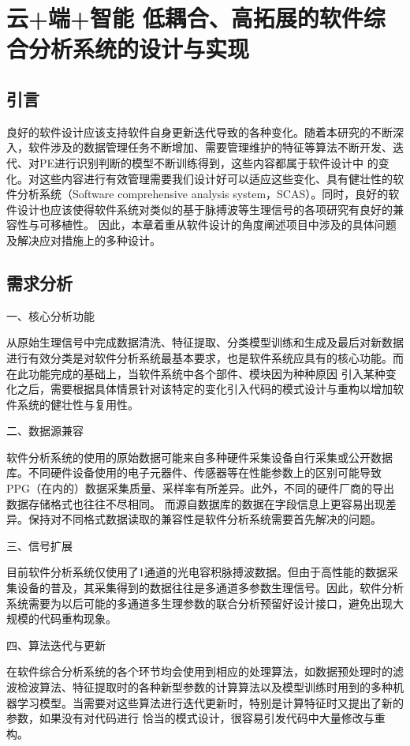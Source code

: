 \chapter{云+端+智能 低耦合、高拓展的软件综合分析系统的设计与实现}
\section{引言}
良好的软件设计应该支持软件自身更新迭代导致的各种变化\cite{Enrich2018}。随着本研究的不断深入，软件涉及的数据管理任务不断增加、需要管理维护的特征等算法不断开发、迭代、对PE进行识别判断的模型不断训练得到，这些内容都属于软件设计中
的变化。对这些内容进行有效管理需要我们设计好可以适应这些变化、具有健壮性的软件分析系统（Software comprehensive analysis system，SCAS）。同时，良好的软件设计也应该使得软件系统对类似的基于脉搏波等生理信号的各项研究有良好的兼容性与可移植性。
因此，本章着重从软件设计的角度阐述项目中涉及的具体问题及解决应对措施上的多种设计。

\section{需求分析}
一、核心分析功能

从原始生理信号中完成数据清洗、特征提取、分类模型训练和生成及最后对新数据进行有效分类是对软件分析系统最基本要求，也是软件系统应具有的核心功能。而在此功能完成的基础上，当软件系统中各个部件、模块因为种种原因
引入某种变化之后，需要根据具体情景针对该特定的变化引入代码的模式设计与重构以增加软件系统的健壮性与复用性。

二、数据源兼容

软件分析系统的使用的原始数据可能来自多种硬件采集设备自行采集或公开数据库。不同硬件设备使用的电子元器件、传感器等在性能参数上的区别可能导致PPG（在内的）数据采集质量、采样率有所差异。此外，不同的硬件厂商的导出数据存储格式也往往不尽相同。
而源自数据库的数据在字段信息上更容易出现差异。保持对不同格式数据读取的兼容性是软件分析系统需要首先解决的问题。

三、信号扩展

目前软件分析系统仅使用了1通道的光电容积脉搏波数据。但由于高性能的数据采集设备的普及，其采集得到的数据往往是多通道多参数生理信号。因此，软件分析系统需要为以后可能的多通道多生理参数的联合分析预留好设计接口，避免出现大规模的代码重构现象。

四、算法迭代与更新

在软件综合分析系统的各个环节均会使用到相应的处理算法，如数据预处理时的滤波检波算法、特征提取时的各种新型参数的计算算法以及模型训练时用到的多种机器学习模型。当需要对这些算法进行迭代更新时，特别是计算特征时又提出了新的参数，如果没有对代码进行
恰当的模式设计，很容易引发代码中大量修改与重构。

